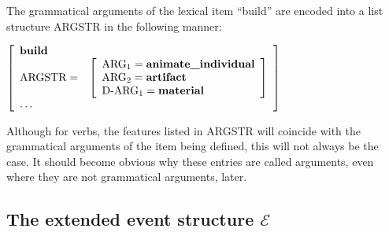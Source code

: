 \documentclass[12pt]{amsart}
\begin{document}
The grammatical arguments of the lexical item ``build'' are encoded into a list structure ARGSTR in the following manner:
\par\vspace{5mm}
$\left[
\begin{array}{l l}
\textbf{build} & \\
\text{ARGSTR} = & \left[ \begin{array}{l}
				\text{ARG}_1=\textbf{animate\_individual} \\
				\text{ARG}_2=\textbf{artifact} \\
				\text{D-ARG}_1=\textbf{material}
				\end{array}\right] \\
\mathellipsis &
\end{array}
\right]$
\par\vspace{5mm}
\noindent Although for verbs, the features listed in ARGSTR will coincide with the grammatical arguments of the item being defined, this will not always be the case. It should become obvious why these entries are called arguments, even where they are not grammatical arguments, later.

\subsection{The extended event structure $\mathcal{E}$}
\end{document}
